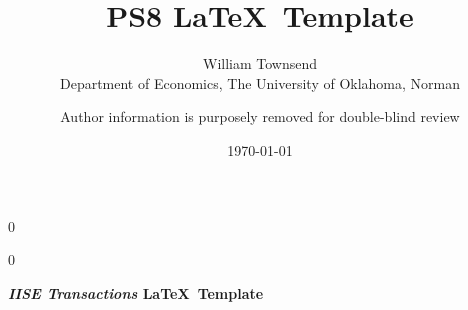 \documentclass[12pt]{article}
\newcommand{\blind}{0}
\begin{document}
		
		\def\spacingset#1{\renewcommand{\baselinestretch}%
			{#1}\small\normalsize} \spacingset{1}
		
		\blind
		{
			\title{\bf PS8}
			
			\author{ William Townsend  \\
			Department of Economics, The University of Oklahoma, Norman\\
             }
			\date{\today}
			\maketitle
		} \fi
		
		\blind
		{

            \title{\bf \emph{} \LaTeX \ Template}
			\author{Author information is purposely removed for double-blind review}
			
\bigskip
			\bigskip
			\bigskip
			\begin{center}
				{\LARGE\bf \emph{IISE Transactions} \LaTeX \ Template}
			\end{center}
			\medskip
		} \fi
		\bigskip
		
%		
%			
%
\end{document}
